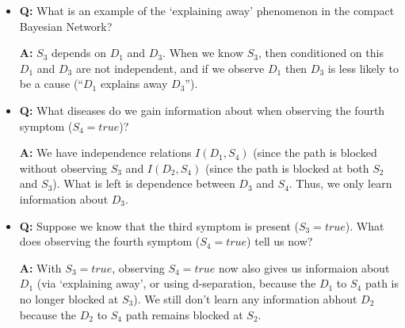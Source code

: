 \documentclass[11pt,letterpaper]{article}
\begin{document}
\begin{itemize}

%
\item \textbf{Q:} What is an example of the `explaining away' phenomenon in the compact Bayesian Network? 

\begin{solution}
\textbf{A:} $S_3$ depends on $D_1$ and $D_3$. When we know $S_3$, then conditioned
on this $D_1$ and $D_3$ are not independent, and 
if we 
observe $D_1$ then $D_3$ is less likely to be a cause (``$D_1$ explains away $D_3$'').\\
\end{solution}


%
%
\item \textbf{Q:} What diseases do we gain information about when 
observing the fourth symptom ($S_4= true$)? 

\begin{solution}
\textbf{A:} We have independence relations $I(D_1,S_4)$ (since the path is blocked
without observing $S_3$ and $I(D_2, S_4)$ (since the path is blocked at both $S_2$
and $S_3$). What is left is dependence between $D_3$ and $S_4$. Thus, we only
learn information about $D_3$.\\
\end{solution}


\item \textbf{Q:} Suppose we know that the third symptom is present ($S_3= true$). What does observing the fourth symptom ($S_4= true$) tell us now? 

\begin{solution}
\textbf{A:} With $S_3= true$, observing $S_4=true$ now also gives us informaion about $D_1$ (via `explaining away', 
or using d-separation, because the $D_1$ to $S_4$ path is no longer blocked at $S_3$). We still don't learn
any information abhout $D_2$ because the $D_2$ to $S_4$ path remains blocked at $S_2$.
%
\end{solution}


\end{itemize}
\end{document}
